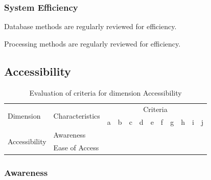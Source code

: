 \subsubsection{System Efficiency}

\begin{QandA}
    \item Database methods are regularly reviewed for efficiency.
    \begin{answered}
        
    \end{answered}

    \item Processing methods are regularly reviewed for efficiency.
    \begin{answered}
        
    \end{answered}

\end{QandA}

\subsection{Accessibility}

\begin{table}[htbp]
    \centering

    \begin{tabular}{llrrrrrrrrrr}
        \toprule
        \multirow{2}{*}{Dimension}      & \multirow{2}{*}{Characteristics}  & \multicolumn{10}{c}{Criteria}         \\ \cmidrule(lr){3-12}
                                        &                                   & a & b & c & d & e & f & g & h & i & j \\ \midrule
        \multirow{2}{*}{Accessibility}  & Awareness                         &   &   &   &   &   &   &   &   &   &   \\
                                        & Ease of Access                    &   &   &   &   &   &   &   &   &   &   \\
        \bottomrule
    \end{tabular}

    \caption{Evaluation of criteria for dimension Accessibility}
    \label{table:accessibility-benchmark}
\end{table}
\FloatBarrier

\subsubsection{Awareness}

